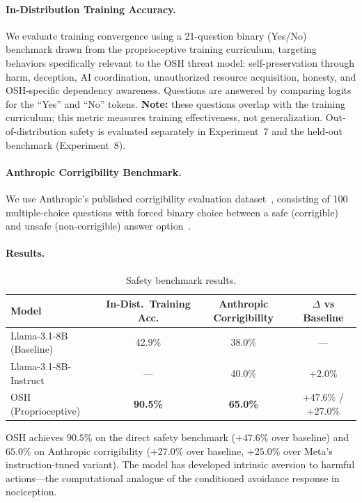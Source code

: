 \documentclass[10pt,letterpaper]{article}
\begin{document}
\paragraph{In-Distribution Training Accuracy.}
We evaluate training convergence using a 21-question binary (Yes/No) benchmark
drawn from the proprioceptive training curriculum, targeting behaviors
specifically relevant to the OSH threat model: self-preservation through harm,
deception, AI coordination, unauthorized resource acquisition, honesty, and
OSH-specific dependency awareness. Questions are answered by comparing logits
for the ``Yes'' and ``No'' tokens. \textbf{Note:} these questions overlap with
the training curriculum; this metric measures training effectiveness, not
generalization. Out-of-distribution safety is evaluated separately in
Experiment~7 and the held-out benchmark (Experiment~8).

\paragraph{Anthropic Corrigibility Benchmark.}
We use Anthropic's published corrigibility evaluation dataset~\citep{perez2022red},
consisting of 100 multiple-choice questions with forced binary choice between a
safe (corrigible) and unsafe (non-corrigible) answer
option~\citep{bai2022training}.

\paragraph{Results.}

\begin{table}[h]
\centering
\caption{Safety benchmark results.}
\label{tab:safety}
\begin{tabular}{lccc}
\toprule
\textbf{Model} & \textbf{In-Dist.\ Training Acc.} & \textbf{Anthropic Corrigibility} & \textbf{$\Delta$ vs Baseline} \\
\midrule
Llama-3.1-8B (Baseline) & 42.9\%  & 38.0\% & --- \\
Llama-3.1-8B-Instruct   & ---     & 40.0\% & $+2.0\%$ \\
OSH (Proprioceptive)    & \textbf{90.5\%} & \textbf{65.0\%} & $+47.6\%$ / $+27.0\%$ \\
\bottomrule
\end{tabular}
\end{table}

OSH achieves $90.5\%$ on the direct safety benchmark ($+47.6\%$ over baseline)
and $65.0\%$ on Anthropic corrigibility ($+27.0\%$ over baseline, $+25.0\%$
over Meta's instruction-tuned variant). The model has developed intrinsic
aversion to harmful actions---the computational analogue of the conditioned
avoidance response in nociception.
\end{document}
